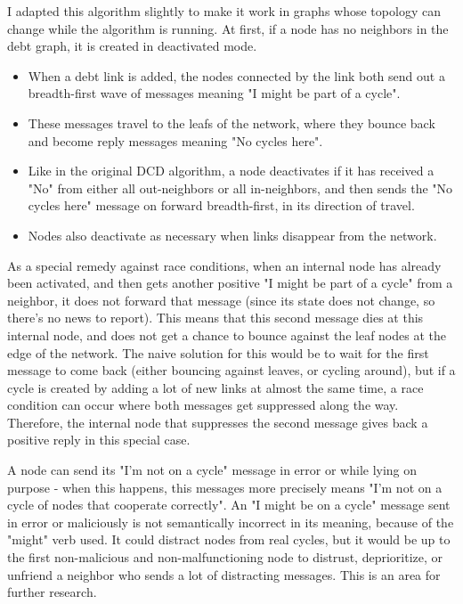 \documentclass[11pt,twoside,a4paper]{article}
\begin{document}
I adapted this algorithm slightly to make it work in graphs whose topology can change while the algorithm is running. At first, if a node has no neighbors in the debt graph, it is created in deactivated mode.

\begin{itemize}
\item When a debt link is added, the nodes connected by the link both send out a breadth-first wave of messages meaning "I might be part of a cycle".
\item These messages travel to the leafs of the network, where they bounce back and become reply messages meaning "No cycles here".
\item Like in the original DCD algorithm, a node deactivates if it has received a "No" from either all out-neighbors or all in-neighbors, and then sends the "No cycles here" message on forward breadth-first, in its direction of travel.
\item Nodes also deactivate as necessary when links disappear from the network.
\end{itemize}

As a special remedy against race conditions, when an internal node has already been activated, and then gets another positive "I might be part of a cycle" from a neighbor, it does not forward that message (since its state does not change, so there's no news to report). This means that this second message dies at this internal node, and does not get a chance to bounce against the leaf nodes at the edge of the network. The naive solution for this would be to wait for the first message to come back (either bouncing against leaves, or cycling around), but if a cycle is created by adding a lot of new links at almost the same time, a race condition can occur where both messages get suppressed along the way. Therefore, the internal node that suppresses the second message gives back a positive reply in this special case.

A node can send its "I'm not on a cycle" message in error or while lying on purpose - when this happens, this messages more precisely means "I'm not on a cycle of nodes that cooperate correctly". An "I might be on a cycle" message sent in error or maliciously is not semantically incorrect in its meaning, because of the "might" verb used. It could distract nodes from real cycles, but it would be up to the first non-malicious and non-malfunctioning node to distrust, deprioritize, or unfriend a neighbor who sends a lot of distracting messages. This is an area for further research.
\end{document}
